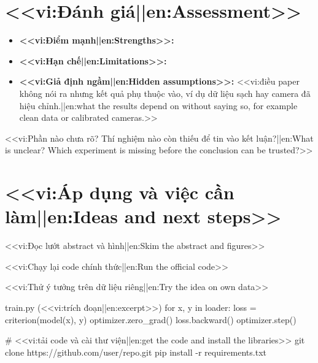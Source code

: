 \documentclass[12pt,a4paper]{article}
\begin{document}
\section{<<vi:Đánh giá||en:Assessment>>}
\begin{itemize}
  \item \textbf{<<vi:Điểm mạnh||en:Strengths>>:} 
  \item \textbf{<<vi:Hạn chế||en:Limitations>>:} 
  \item \textbf{<<vi:Giả định ngầm||en:Hidden assumptions>>:} <<vi:điều paper không nói ra nhưng kết quả phụ thuộc vào, ví dụ dữ liệu sạch hay camera đã hiệu chỉnh.||en:what the results depend on without saying so, for example clean data or calibrated cameras.>>
\end{itemize}

\begin{question}
<<vi:Phần nào chưa rõ? Thí nghiệm nào còn thiếu để tin vào kết luận?||en:What is unclear? Which experiment is missing before the conclusion can be trusted?>>
\end{question}

\section{<<vi:Áp dụng và việc cần làm||en:Ideas and next steps>>}
\begin{checklist}
  \done <<vi:Đọc lướt abstract và hình||en:Skim the abstract and figures>>
  \item <<vi:Chạy lại code chính thức||en:Run the official code>>
  \item <<vi:Thử ý tưởng trên dữ liệu riêng||en:Try the idea on own data>>
\end{checklist}

\begin{lkcode}[Python]{train.py (<<vi:trích đoạn||en:excerpt>>)}
for x, y in loader:
    loss = criterion(model(x), y)
    optimizer.zero_grad()
    loss.backward()
    optimizer.step()
\end{lkcode}

\begin{lkterminal}[title=<<vi:Cài đặt||en:Setup>>]
# <<vi:tải code và cài thư viện||en:get the code and install the libraries>>
git clone https://github.com/user/repo.git
pip install -r requirements.txt
\end{lkterminal}
\end{document}
